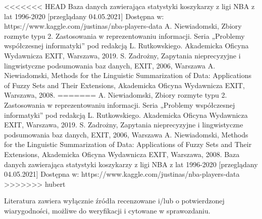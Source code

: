 \documentclass{classrep}
\begin{document}
\begin{thebibliography}{99}
<<<<<<< HEAD
 Baza danych zawierająca statystyki koszykarzy z ligi NBA z lat 1996-2020 [przeglądany 04.05.2021] Dostępna w:
https://www.kaggle.com/justinas/nba-players-data
  A. Niewiadomski, Zbiory rozmyte typu 2. Zastosowania w reprezentowaniu informacji.  Seria „Problemy współczesnej informatyki” pod redakcją L. Rutkowskiego. Akademicka Oficyna Wydawnicza EXIT, Warszawa, 2019.
 S. Zadrożny, Zapytania nieprecyzyjne i lingwistyczne podsumowania baz danych, EXIT, 2006, Warszawa
 A. Niewiadomski, Methods for the Linguistic Summarization of Data: Applications of Fuzzy Sets and Their Extensions, Akademicka Oficyna Wydawnicza EXIT, Warszawa, 2008.
=======
  A. Niewiadomski, Zbiory rozmyte typu 2. Zastosowania w reprezentowaniu informacji.  Seria „Problemy współczesnej informatyki” pod redakcją L. Rutkowskiego. Akademicka Oficyna Wydawnicza EXIT, Warszawa, 2019.
 S. Zadrożny, Zapytania nieprecyzyjne i lingwistyczne podsumowania baz danych, EXIT, 2006, Warszawa
 A. Niewiadomski, Methods for the Linguistic Summarization of Data: Applications of Fuzzy Sets and Their Extensions, Akademicka Oficyna Wydawnicza EXIT, Warszawa, 2008.
 Baza danych zawierająca statystyki koszykarzy z ligi NBA z lat 1996-2020 [przeglądany 04.05.2021] Dostępna w:
https://www.kaggle.com/justinas/nba-players-data
>>>>>>> hubert
\end{thebibliography}

Literatura zawiera wyłącznie źródła recenzowane i/lub o potwierdzonej wiarygodności,
możliwe do weryfikacji i cytowane w sprawozdaniu. 
\end{document}
